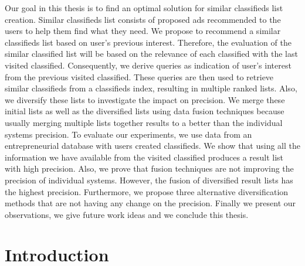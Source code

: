 \abstract

Our goal in this thesis is to find an optimal solution for similar classifieds list creation. Similar classifieds list consists of proposed ads recommended to the users to help them find what they need. We propose to recommend a similar classifieds list based on user's previous interest. Therefore, the evaluation of the similar classified list will be based on the relevance of each classified with the last visited classified. Consequently, we derive queries as indication of user's interest from the previous visited classified. These queries are then used to retrieve similar classifieds from a classifieds index, resulting in multiple ranked lists. Also, we diversify these lists to investigate the impact on precision. We merge these initial lists as well as the diversified lists using data fusion techniques because usually merging multiple lists together results to a better than the individual systems precision. To evaluate our experiments, we use data from an entrepreneurial database with users created classifieds. We show that using all the information we have available from the visited classified produces a result list with high precision. Also, we prove that fusion techniques are not improving the precision of individual systems. However, the fusion of diversified result lists has the highest precision. Furthermore, we propose three alternative diversification methods that are not having any change on the precision. Finally we present our observations, we give future work ideas and we conclude this thesis.


\newpage
\tableofcontents


\chapter{Introduction}


